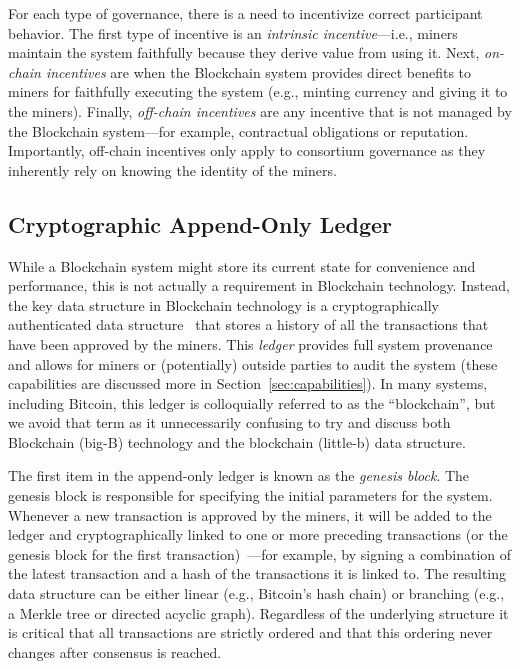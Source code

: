 For each type of governance, there is a need to incentivize correct participant behavior.
The first type of incentive is an \emph{intrinsic incentive}---i.e., miners maintain the system faithfully because they derive value from using it.
Next, \emph{on-chain incentives} are when the Blockchain system provides direct benefits to miners for faithfully executing the system (e.g., minting currency and giving it to the miners).
Finally, \emph{off-chain incentives} are any incentive that is not managed by the Blockchain system---for example, contractual obligations or reputation.
Importantly, off-chain incentives only apply to consortium governance as they inherently rely on knowing the identity of the miners.

\subsection{Cryptographic Append-Only Ledger}
While a Blockchain system might store its current state for convenience and performance, this is not actually a requirement in Blockchain technology.
Instead, the key data structure in Blockchain technology is a cryptographically authenticated data structure~\cite{tamassia2003authenticated} that stores a history of all the transactions that have been approved by the miners.
This \emph{ledger} provides full system provenance and allows for miners or (potentially) outside parties to audit the system (these capabilities are discussed more in Section~\ref{sec:capabilities}).
In many systems, including Bitcoin, this ledger is colloquially referred to as the ``blockchain'', but we avoid that term as it unnecessarily confusing to try and discuss both Blockchain (big-B) technology and the blockchain (little-b) data structure.

The first item in the append-only ledger is known as the \emph{genesis block}.
The genesis block is responsible for specifying the initial parameters for the system.
Whenever a new transaction is approved by the miners, it will be added to the ledger and cryptographically linked to one or more preceding transactions (or the genesis block for the first transaction)~\cite{bayer1993improving,haber1990time,haber1997secure}---for example, by signing a combination of the latest transaction and a hash of the transactions it is linked to.
The resulting data structure can be either linear (e.g., Bitcoin's hash chain) or branching (e.g., a Merkle tree or directed acyclic graph).
Regardless of the underlying structure it is critical that all transactions are strictly ordered and that this ordering never changes after consensus is reached.

